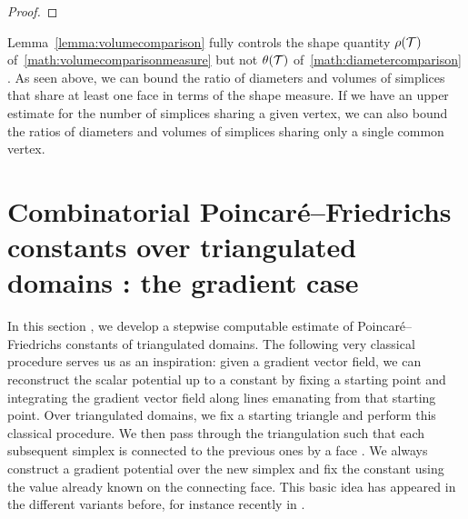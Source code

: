 \documentclass[10pt,letterpaper]{article}
\newcommand\cye[1]{%
  \protect\leavevmode
  \begingroup
    \color{red!35!yellow}%
    #1%
  \endgroup
}
\begin{document}
\begin{proof}
\end{proof}

\begin{remark}
    Lemma~\ref{lemma:volumecomparison} fully controls the shape quantity $\rho({\mathcal T})$ \cye{of~\eqref{math:volumecomparisonmeasure}} but not $\theta({\mathcal T})$ \cye{of~\eqref{math:diametercomparison}}. 
    As seen above, we can bound the ratio of diameters and volumes of simplices that share at least one \cye{face} in terms of the shape measure. 
    If we have an upper estimate for the number of simplices sharing a given vertex, 
    we can also bound the ratios of diameters and volumes of simplices sharing only a single common vertex. 
\end{remark}


\section{\cye{Combinatorial} Poincar\'e--Friedrichs \cye{constants over} triangulated domains\cye{: the gradient case}}\label{section:gradient}

In this section\cye{,} we \cye{develop a} stepwise computable estimate of Poincar\'e--Friedrichs constants of triangulated domains. \cye{The following very classical procedure serves us as an inspiration:} given a gradient vector field, we can reconstruct \cye{the scalar potential} up to a constant by fixing a starting point and integrating the gradient vector field along lines emanating from that starting point. 
Over triangulated domains, \cye{we fix} a starting triangle \cye{and perform this classical procedure. We then pass through the triangulation such that each subsequent simplex is connected to the previous ones by a face}. 
We always construct a gradient potential over the new simplex and fix the constant using the value already known on the connecting face.
This basic idea has appeared in the different variants before, for instance recently in \cite{Brae_Pill_Sch_p_rob_09, ern2020stable, Chaum_Voh_p_rob_3D_H_curl_24, Voh_loc_glob_H1_24}.
\end{document}

